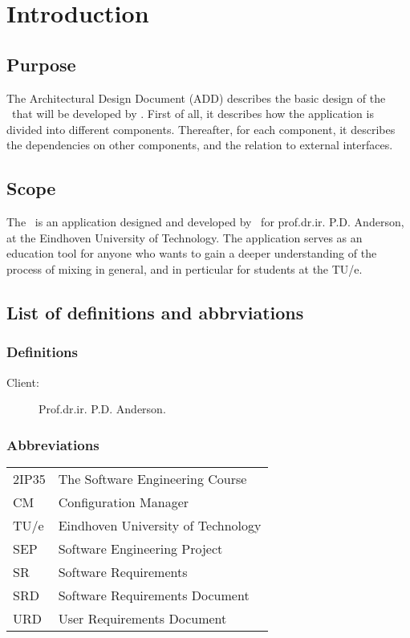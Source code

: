 \chapter{Introduction}

\section{Purpose}
The Architectural Design Document (ADD) describes the basic design of the \applicationname\ that will be developed by \projectauthor. First of all, it describes how the application is divided into different components. Thereafter, for each component, it describes the dependencies on other components, and the relation to external interfaces.

\section{Scope}
The \applicationname\ is an application designed and developed by \projectauthor\ for prof.dr.ir. P.D. Anderson, at the Eindhoven University of Technology. The application serves as an education tool for anyone who wants to gain a deeper understanding of the process of mixing in general, and in perticular for students at the TU/e.

\section{List of definitions and abbrviations}
\subsection{Definitions}
\begin{description}
\item[Client:] Prof.dr.ir. P.D. Anderson.
\end{description}

\subsection{Abbreviations}
\begin{tabular}{l|l}
2IP35 & The Software Engineering Course \\
CM    & Configuration Manager \\
TU/e  & Eindhoven University of Technology \\
SEP   & Software Engineering Project \\
SR    & Software Requirements \\
SRD   & Software Requirements Document \\
URD   & User Requirements Document \\
\end{tabular}

